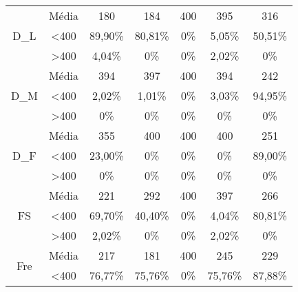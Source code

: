 \begin{table}[]
\begin{tabular}{|c|c|ccccc|}
\multirow{3}{*}{D\_L}           & Média            & 180               & 184               & 400               & 395               & 316               \\
                                & \textless 400    & 89,90\%           & 80,81\%           & 0\%            & 5,05\%            & 50,51\%           \\
                                & \textgreater 400 & 4,04\%            & 0\%            & 0\%            & 2,02\%            & 0\%            \\ \hline
\multirow{3}{*}{D\_M}           & Média            & 394               & 397               & 400               & 394               & 242               \\
                                & \textless 400    & 2,02\%            & 1,01\%            & 0\%            & 3,03\%            & 94,95\%           \\
                                & \textgreater 400 & 0\%            & 0\%            & 0\%            & 0\%            & 0\%            \\ \hline
\multirow{3}{*}{D\_F}           & Média            & 355               & 400               & 400               & 400               & 251               \\
                                & \textless 400    & 23,00\%           & 0\%            & 0\%            & 0\%            & 89,00\%           \\
                                & \textgreater 400 & 0\%            & 0\%            & 0\%            & 0\%            & 0\%            \\ \hline
\multirow{3}{*}{FS}             & Média            & 221               & 292               & 400               & 397               & 266               \\
                                & \textless 400    & 69,70\%           & 40,40\%           & 0\%            & 4,04\%            & 80,81\%           \\
                                & \textgreater 400 & 2,02\%            & 0\%            & 0\%            & 2,02\%            & 0\%            \\ \hline
\multirow{3}{*}{Fre}            & Média            & 217               & 181               & 400               & 245               & 229               \\
                                & \textless 400    & 76,77\%           & 75,76\%           & 0\%            & 75,76\%           & 87,88\%           \\

\end{tabular}
\end{table}
